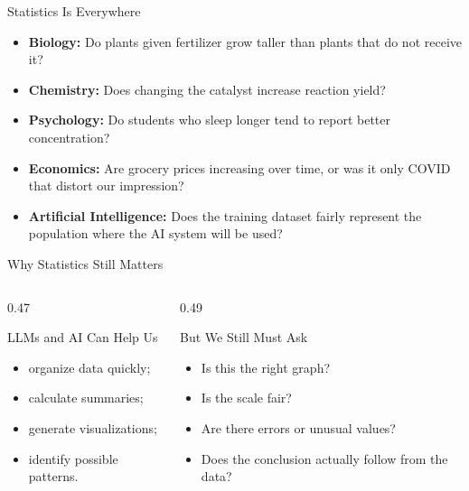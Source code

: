 \documentclass[aspectratio=169]{beamer}
\begin{document}
\begin{frame}{Statistics Is Everywhere}
  \begin{itemize}
    \item \textbf{Biology:} Do plants given fertilizer grow taller than plants that do not receive it?
    \item \textbf{Chemistry:} Does changing the catalyst increase reaction yield?
    \item \textbf{Psychology:} Do students who sleep longer tend to report better concentration?
    \item \textbf{Economics:} Are grocery prices increasing over time, or was it only COVID that distort our impression?
    \item \textbf{Artificial Intelligence:} Does the training dataset fairly represent the population where the AI system will be used?
  \end{itemize}
\end{frame}

\begin{frame}{Why Statistics Still Matters}
  \vspace{0.15cm}
  \begin{columns}[T]
    \begin{column}{0.47\textwidth}
      \begin{block}{LLMs and AI Can Help Us}
        \begin{itemize}
          \item organize data quickly;
          \item calculate summaries;
          \item generate visualizations;
          \item identify possible patterns.
        \end{itemize}
      \end{block}
    \end{column}
    \begin{column}{0.49\textwidth}
      \begin{alertblock}{But We Still Must Ask}
        \begin{itemize}
          \item Is this the right graph?
          \item Is the scale fair?
          \item Are there errors or unusual values?
          \item Does the conclusion actually follow from the data?
        \end{itemize}
      \end{alertblock}
    \end{column}
  \end{columns}
\end{frame}
\end{document}
